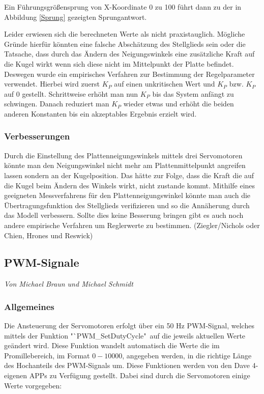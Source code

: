 \documentclass[12pt,a4paper,bibliography=totoc,listof=totoc]{scrartcl}
\begin{document}
Ein Führungsgrößensprung von X-Koordinate 0 zu 100 führt dann zu der in Abbildung \ref{Sprung} gezeigten Sprungantwort.

Leider erwiesen sich die berechneten Werte als nicht praxistauglich. Mögliche Gründe hierfür könnten eine falsche Abschätzung des Stellglieds sein oder die Tatsache, dass durch das Ändern des Neigungswinkels eine zusätzliche Kraft auf die Kugel wirkt wenn sich diese nicht im Mittelpunkt der Platte befindet.\newline
Deswegen wurde ein empirisches Verfahren zur Bestimmung der Regelparameter verwendet. Hierbei wird zuerst \(K_P\) auf einen unkritischen Wert und \(K_P\) bzw. \(K_P\) auf 0 gestellt. Schrittweise erhöht man nun \(K_P\) bis das System anfängt zu schwingen. Danach reduziert man \(K_P\) wieder etwas und erhöht die beiden anderen Konstanten bis ein akzeptables Ergebnis erzielt wird. 

\subsubsection{Verbesserungen}
Durch die Einstellung des Plattenneigungswinkels mittels drei Servomotoren könnte man den Neigungswinkel nicht mehr am Plattenmittelpunkt angreifen lassen sondern an der Kugelposition. Das hätte zur Folge, dass die Kraft die auf die Kugel beim Ändern des Winkels wirkt, nicht zustande kommt.\newline
Mithilfe eines geeigneten Messverfahrens für den Plattenneigungswinkel könnte man auch die Übertragungsfunktion des Stellglieds verifizieren und so die Annäherung durch das Modell verbessern.
Sollte dies keine Besserung bringen gibt es auch noch andere empirische Verfahren um Reglerwerte zu bestimmen. (Ziegler/Nichols oder Chien, Hrones und Reswick)

\subsection{PWM-Signale}
\textit{Von Michael Braun und Michael Schmidt}\newline
\subsubsection{ Allgemeines}
Die Ansteuerung der Servomotoren erfolgt über ein 50 Hz PWM-Signal, welches mittels der Funktion 
"`PWM\_SetDutyCycle"\, auf die jeweils aktuellen Werte geändert wird. Diese Funktion wandelt automatisch 
die Werte die im Promillebereich, im Format $0-10000$, angegeben werden, in die richtige Länge des 
Hochanteils des PWM-Signals um. Diese Funktionen werden von den Dave 4- eigenen APPs zu Verfügung 
gestellt. Dabei sind durch die Servomotoren einige Werte vorgegeben:
\end{document}

